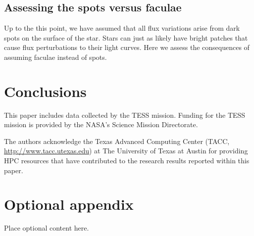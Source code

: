 \documentclass[twocolumn]{aastex631}
\begin{document}
\subsection{Assessing the spots versus faculae}
Up to the this point, we have assumed that all flux variations arise from dark spots on the surface of the star. Stars can just as likely have bright patches that cause flux perturbations to their light curves. Here we assess the consequences of assuming faculae instead of spots.

\section{Conclusions}

\begin{acknowledgements}
  This paper includes data collected by the TESS mission. Funding for the TESS mission is provided by the NASA's Science Mission Directorate.

  The authors acknowledge the Texas Advanced Computing Center (TACC, \url{http://www.tacc.utexas.edu}) at The University of Texas at Austin for providing HPC resources that have contributed to the research results reported within this paper.
\end{acknowledgements}

\clearpage








\clearpage

\appendix
\restartappendixnumbering

\section{Optional appendix} \label{appendix:tools}

Place optional content here.
\end{document}
